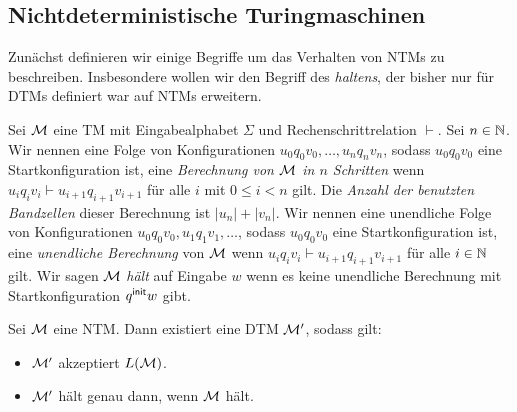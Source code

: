 



\subsection{Nichtdeterministische Turingmaschinen}

Zunächst definieren wir einige Begriffe um das Verhalten von \acp{NTM} zu beschreiben.
Insbesondere wollen wir den Begriff des \emph{haltens}, 
der bisher nur für \acp{DTM} definiert war auf \acp{NTM} erweitern.


\begin{Def}[Berechnung]
	Sei $\mathcal{M}$ eine TM mit Eingabealphabet $\Sigma$ und Rechenschrittrelation $\vdash$.
	Sei $n\in\mathbb{N}$. Wir nennen eine Folge von Konfigurationen $u_0q_0v_0, \ldots, u_nq_nv_n$,
	sodass $u_0q_0v_0$ eine Startkonfiguration ist,
	eine \emph{Berechnung von $\mathcal{M}$ in $n$ Schritten} wenn $u_iq_iv_i\vdash u_{i+1}q_{i+1}v_{i+1}$
	für alle $i$ mit $0\leq i < n$ gilt.
	Die \emph{Anzahl der benutzten Bandzellen} dieser Berechnung ist $|u_n|+|v_n|$.
	Wir nennen eine unendliche Folge von Konfigurationen $u_0q_0v_0, u_1q_1v_1,\ldots$,
	sodass $u_0q_0v_0$ eine Startkonfiguration ist,
	eine \emph{unendliche Berechnung} von $\mathcal{M}$ wenn $u_iq_iv_i\vdash u_{i+1}q_{i+1}v_{i+1}$
	für alle $i\in\mathbb{N}$ gilt.
	Wir sagen $\mathcal{M}$ \emph{hält} auf Eingabe $w$ wenn es keine unendliche Berechnung
	mit Startkonfiguration $q^\mathsf{init} w$ gibt.
\end{Def}





\begin{Satz}\label{satz:Ntm2Dtm}
	Sei $\mathcal{M}$ eine \ac{NTM}.
	Dann existiert eine \ac{DTM} $\mathcal{M}'$, sodass gilt:
	\begin{itemize}
	\item $\mathcal{M}'$ akzeptiert $L(\mathcal{M})$.
	\item $\mathcal{M}'$ hält genau dann, wenn $\mathcal{M}$ hält.
	\qedhere
	\end{itemize}
\end{Satz}

